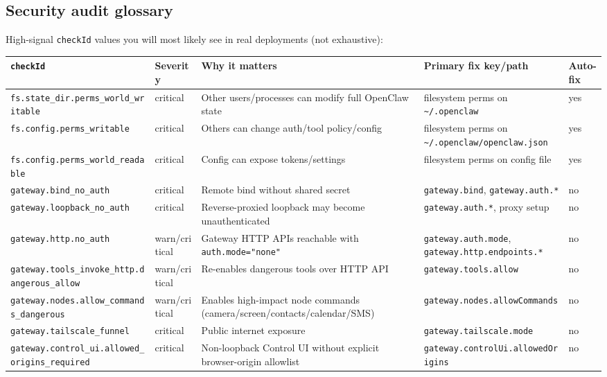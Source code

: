 \subsection{Security audit glossary}


High-signal \texttt{checkId} values you will most likely see in real deployments (not exhaustive):


\begin{table}[h]
\centering
\small
\begin{tabular}{|l|l|l|l|l|}
\hline
\texttt{checkId} & Severity & Why it matters & Primary fix key/path & Auto-fix \\
\hline
\texttt{fs.state\_dir.perms\_world\_writable} & critical & Other users/processes can modify full OpenClaw state & filesystem perms on \texttt{\textasciitilde{}/.openclaw} & yes \\
\hline
\texttt{fs.config.perms\_writable} & critical & Others can change auth/tool policy/config & filesystem perms on \texttt{\textasciitilde{}/.openclaw/openclaw.json} & yes \\
\hline
\texttt{fs.config.perms\_world\_readable} & critical & Config can expose tokens/settings & filesystem perms on config file & yes \\
\hline
\texttt{gateway.bind\_no\_auth} & critical & Remote bind without shared secret & \texttt{gateway.bind}, \texttt{gateway.auth.*} & no \\
\hline
\texttt{gateway.loopback\_no\_auth} & critical & Reverse-proxied loopback may become unauthenticated & \texttt{gateway.auth.*}, proxy setup & no \\
\hline
\texttt{gateway.http.no\_auth} & warn/critical & Gateway HTTP APIs reachable with \texttt{auth.mode="none"} & \texttt{gateway.auth.mode}, \texttt{gateway.http.endpoints.*} & no \\
\hline
\texttt{gateway.tools\_invoke\_http.dangerous\_allow} & warn/critical & Re-enables dangerous tools over HTTP API & \texttt{gateway.tools.allow} & no \\
\hline
\texttt{gateway.nodes.allow\_commands\_dangerous} & warn/critical & Enables high-impact node commands (camera/screen/contacts/calendar/SMS) & \texttt{gateway.nodes.allowCommands} & no \\
\hline
\texttt{gateway.tailscale\_funnel} & critical & Public internet exposure & \texttt{gateway.tailscale.mode} & no \\
\hline
\texttt{gateway.control\_ui.allowed\_origins\_required} & critical & Non-loopback Control UI without explicit browser-origin allowlist & \texttt{gateway.controlUi.allowedOrigins} & no \\

\end{tabular}
\end{table}
